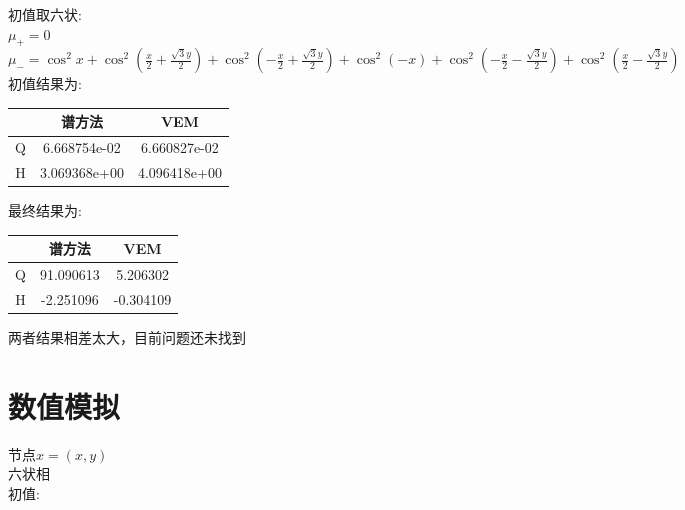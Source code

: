 \documentclass[12pt]{article}
\begin{document}
\begin{CJK}{UTF8}{gkai}
    初值取六状:\\
    
        $ \mu_+=0 $\\
        
        $ \mu_-=\cos^{2}x+\cos^2 (\frac{x}{2}+\frac{\sqrt{3}y}{2})+\cos^2(-\frac{x}{2}+\frac{\sqrt{3}y}{2})+\cos^{2}(-x)+\cos^2 (-\frac{x}{2}-\frac{\sqrt{3}y}{2})+\cos^2 (\frac{x}{2}-\frac{\sqrt{3}y}{2})$\\
        
        初值结果为:\\
             \begin{table}[H]
             	\centering
             	\begin{tabular}{ccc}
             		
             		\toprule
             		&谱方法 & VEM  \\
             		\midrule    
             		Q&6.668754e-02&6.660827e-02\\
             		H&3.069368e+00&4.096418e+00\\
             		\bottomrule
             	\end{tabular}
             \end{table} 
             最终结果为:\\
             
 \begin{table}[H]
 	\centering
 	\begin{tabular}{ccc}
 		
 		\toprule
 		&谱方法 & VEM  \\
 		\midrule    
 		Q&91.090613&5.206302\\
 		H&-2.251096&-0.304109\\
 		\bottomrule
 	\end{tabular}
 \end{table} 
       
    两者结果相差太大，目前问题还未找到\\
    
   \section{数值模拟}

    
    节点$x=(x,y)$\\
    
    六状相\\
    
    初值:\\
    

\end{CJK}
\end{document}
